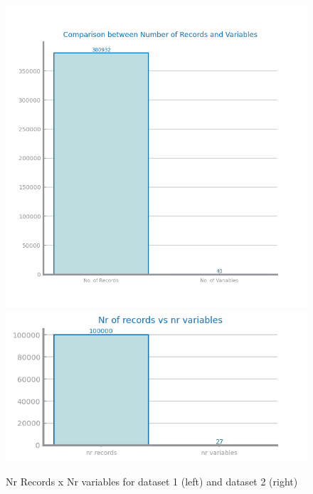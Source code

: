 \documentclass[10pt]{extarticle}
\begin{document}
\begin{figure}[H]
\centering
\includegraphics[scale=0.70]{images/dataset1/data_profiling/CovidPos_records_variables.png}
\includegraphics[scale=0.7]{images/dataset2/data_profiling/Credit_Score_records_variables.png}
\caption{Nr Records x Nr variables for dataset 1 (left) and dataset 2 (right)} 
\end{figure}
\end{document}
